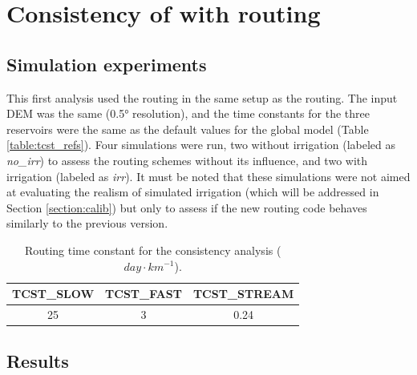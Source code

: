 \section{Consistency of \native with \std routing}
\subsection{Simulation experiments}

This first analysis used the \native routing in the same setup as the \std routing. 
The input DEM was the same (0.5° resolution), and the time constants for the three reservoirs were the same as the default values for the global model (Table \ref{table:tcst_refs}). Four simulations were run, two without irrigation (labeled as \textit{no\_irr}) to assess the routing schemes without its influence, and two with irrigation (labeled as \textit{irr}). It must be noted that these simulations were not aimed at evaluating the realism of simulated irrigation (which will be addressed in Section \ref{section:calib}) but only to assess if the new routing code behaves similarly to the previous version.

\begin{table}[h]
\centering
\begin{tabular}{|c|c|c|}
\hline
\textbf{TCST\_SLOW} & \textbf{TCST\_FAST} & \textbf{TCST\_STREAM} \\ \hline
25            & 3             & 0.24            \\ \hline
\end{tabular}
\caption{Routing time constant for the consistency analysis ($day \cdot km^{-1}$).}
\label{table:tcst_consistency}
\end{table}

\subsection{Results}

